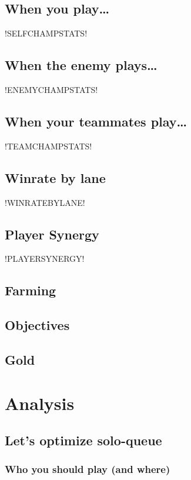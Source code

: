 \documentclass[paper=letter, landscape, oneside]{report}
\begin{document}
\section{When you play\dots}

!SELFCHAMPSTATS!


\section{When the enemy plays\dots}

!ENEMYCHAMPSTATS!


\section{When your teammates play\dots}

!TEAMCHAMPSTATS!


\section{Winrate by lane}

!WINRATEBYLANE!


\section{Player Synergy}

!PLAYERSYNERGY!


\section{Farming}

\section{Objectives}

\section{Gold}

\chapter{Analysis}

\section{Let's optimize solo-queue}
\subsection{Who you should play (and where)}
\end{document}
